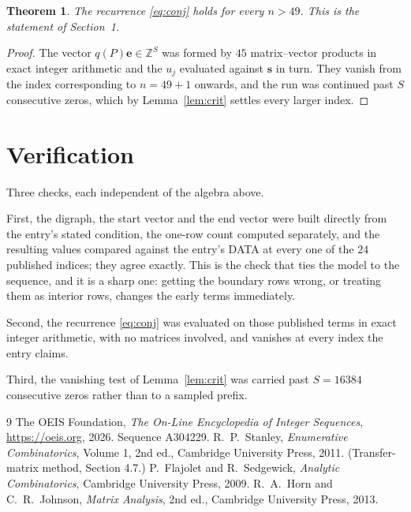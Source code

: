 \documentclass[11pt,a4paper]{article}
\theoremstyle{plain}
\newtheorem{theorem}{Theorem}
\theoremstyle{definition}
\begin{document}
\begin{theorem}
The recurrence \eqref{eq:conj} holds for every $n>49$. This is the statement of
Section~1.
\end{theorem}

\begin{proof}
The vector $q(P)\mathbf{e}\in\mathbb{Z}^{S}$ was formed by $45$ matrix--vector
products in exact integer arithmetic and the $u_j$ evaluated against $\mathbf{s}$ in turn.
They vanish from the index corresponding to $n=49+1$ onwards, and the run was continued
past $S$ consecutive zeros, which by Lemma~\ref{lem:crit} settles every larger index.
\end{proof}

\section{Verification}

Three checks, each independent of the algebra above.

First, the digraph, the start vector and the end vector were built directly from the
entry's stated condition, the one-row count computed separately, and the resulting values
compared against the entry's DATA at every one of the $24$ published indices; they
agree exactly. This is the check that ties the model to the sequence, and it is a sharp one:
getting the boundary rows wrong, or treating them as interior rows, changes the early terms
immediately.

Second, the recurrence \eqref{eq:conj} was evaluated on those published terms in exact
integer arithmetic, with no matrices involved, and vanishes at every index the entry claims.

Third, the vanishing test of Lemma~\ref{lem:crit} was carried past $S=16384$ consecutive
zeros rather than to a sampled prefix.

\begin{thebibliography}{9}
 The OEIS Foundation, \emph{The On-Line Encyclopedia of Integer
Sequences}, \url{https://oeis.org}, 2026. Sequence A304229.
 R.~P.~Stanley, \emph{Enumerative Combinatorics}, Volume 1, 2nd ed.,
Cambridge University Press, 2011. (Transfer-matrix method, Section 4.7.)
 P.~Flajolet and R.~Sedgewick, \emph{Analytic Combinatorics}, Cambridge
University Press, 2009.
 R.~A.~Horn and C.~R.~Johnson, \emph{Matrix Analysis}, 2nd ed., Cambridge
University Press, 2013.
\end{thebibliography}
\end{document}
